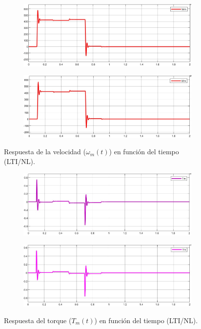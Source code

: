 \documentclass{article}
\begin{document}
\begin{figure}[H]
    \centering
    \begin{subfigure}[b]{0.8\textwidth}
        \includegraphics[width=\textwidth]{5.1.6_omega.jpg}
    \end{subfigure}
    \begin{subfigure}[b]{0.8\textwidth}
        \includegraphics[width=1\textwidth]{5.1.6_omega_NL.jpg}
    \end{subfigure}
    \caption{Respuesta de la velocidad ($\omega_m(t)$) en función del tiempo (LTI/NL).}
    \label{fig:velocidad}
\end{figure}

\begin{figure}[H]
    \centering
    \begin{subfigure}[b]{0.8\textwidth}
        \includegraphics[width=\textwidth]{5.1.6_torque.jpg}
    \end{subfigure}
    \begin{subfigure}[b]{0.8\textwidth}
        \includegraphics[width=1\textwidth]{5.1.6_torque_NL.jpg}
    \end{subfigure}
    \caption{Respuesta del torque ($T_m(t)$) en función del tiempo (LTI/NL).}
    \label{fig:torque_electromagentico}
\end{figure}
\end{document}
